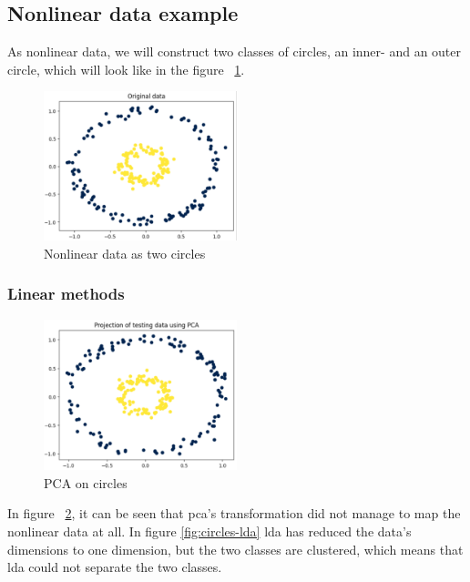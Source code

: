 \subsection{Nonlinear data example}\label{subsec:nonlinear-data-example}
As nonlinear data, we will construct two classes of circles, an inner- and an outer circle, which will look like in the figure ~\ref{fig:circles}.

\begin{figure}[htb!]
    \centering
    \includegraphics[width=0.5\textwidth]{figures/theory-example-figures/fig-circles.png}
    \caption{Nonlinear data as two circles}
    \label{fig:circles}
    \end{figure}

\subsubsection{Linear methods}\label{subsubsec:linear-methods-on-circles}
\begin{figure}[htb!]
    \centering
    \includegraphics[width=0.5\textwidth]{figures/theory-example-figures/circles-pca.png}
    \caption{PCA on circles}
    \label{fig:circles-pca}
\end{figure}

In figure ~\ref{fig:circles-pca}, it can be seen that \gls{pca}'s transformation did not manage to map the nonlinear data at all. In figure \ref{fig:circles-lda} \gls{lda} has reduced the data's dimensions to one dimension, but the two classes are clustered, which means that \gls{lda} could not separate the two classes.

